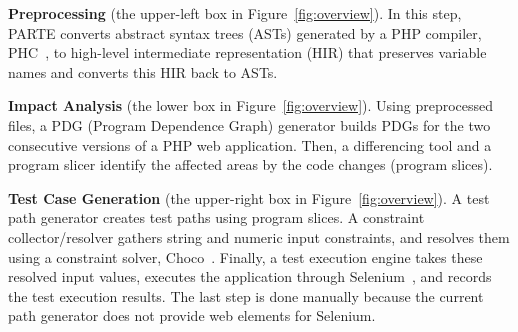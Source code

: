 \begin{smallitem}
\item {\bf Preprocessing} (the upper-left box in Figure~\ref{fig:overview}).
In this step, PARTE converts abstract syntax trees (ASTs) generated by
a PHP compiler, PHC~\cite{phc}, to high-level
intermediate representation (HIR) that preserves variable
names and converts this HIR back to ASTs.   

\item {\bf Impact Analysis} (the lower box in Figure~\ref{fig:overview}).
Using preprocessed files, a PDG (Program Dependence Graph) generator 
builds PDGs for the two consecutive versions of a PHP web application. 
Then, a differencing tool and a program slicer identify 
the affected areas by the code changes (program slices).

\item {\bf Test Case Generation} (the upper-right box 
in Figure~\ref{fig:overview}).
A test path generator creates test paths using program slices. 
A constraint collector/resolver gathers string and numeric 
input constraints, and resolves them using a constraint 
solver, Choco~\cite{choco}.
Finally, a test execution engine takes these resolved input 
values, executes the application through Selenium~\cite{selenium},
and records the test execution results.
The last step is done manually because the current path 
generator does not provide web elements for Selenium.
 
\end{smallitem}





